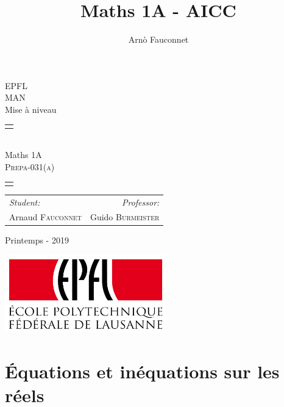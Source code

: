 \documentclass[
    11pt,
    a4paper,
    oneside,
    headinlcude, footinclude,
    twoside,
]{report}
\title{Maths 1A - AICC}
\author{Arnò Fauconnet}
\begin{document}
\begin{titlepage}
   \begin{center}
       \vspace*{\fill}

       {\Huge EPFL}\\ 
       \vfill
       {\huge MAN}\\ [1em]
       {\Large Mise à niveau}\\
        \vfill
        \begin{tabularx}{\textwidth}{X}
            \Xhline{3\arrayrulewidth}\\
        \end{tabularx}\\ [2em]
        {\Huge Maths 1A} \\ [1em]
        \textsc{\huge Prepa-031(a)} \\ [2em]
       \begin{tabularx}{\textwidth}{X}
            \Xhline{3\arrayrulewidth}\\
        \end{tabularx}
        \vspace{.7cm}
        {\large
        \begin{tabularx}{.9\textwidth}{Xr}
            \textit{Student:} & \textit{Professor:}\\
            Arnaud \textsc{Fauconnet} & Guido \textsc{Burmeister}
        \end{tabularx}}
        \vfill
        {\Large Printemps - 2019}

        \vfill
        \includegraphics[width=7cm]{epfl-logo}

       \vfill
   \end{center} 
\end{titlepage} 
\setcounter{chapter}{1}
\chapter{Équations et inéquations sur les réels}
\label{sec:equations_et_inequations_sur_les_reels}
\end{document}
